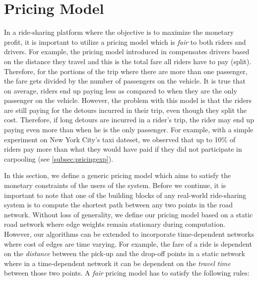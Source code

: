 \section{Pricing Model}
\label{sec:pricing}


In a ride-sharing platform where the objective is to maximize the monetary profit, it is important to utilize a pricing model which is \textit{fair} to both riders and drivers. For example, the pricing model introduced in \cite{Ma13} compensates drivers based on the distance they travel and this is the total fare all riders have to pay (split). Therefore, for the portions of the trip where there are more than one passenger, the fare gets divided by the number of passengers on the vehicle. It is true that on average, riders end up paying less as compared to when they are the only passenger on the vehicle. However, the problem with this model is that the riders are still paying for the detours incurred in their trip, even though they split the cost. Therefore, if long detours are incurred in a rider's trip, the rider may end up paying even more than when he is the only passenger. For example, with a simple experiment on New York City's taxi dateset, we observed that up to 10\% of riders pay more than what they would have paid if they did not participate in carpooling (see \cref{subsec:pricingexp}).

In this section, we define a generic pricing model which aims to satisfy the monetary constraints of the users of the system. Before we continue, it is important to note that one of the building blocks of any real-world ride-sharing system is to compute the shortest path between any two points in the road network. Without loss of generality, we define our pricing model based on a static road network where edge weights remain stationary during computation. However, our algorithms can be extended to incorporate time-dependent networks where cost of edges are time varying. For example, the fare of a ride is dependent on the \textit{distance} between the pick-up and the drop-off points in a static network where in a time-dependent network it can be dependent on the \textit{travel time} between those two points. A \textit{fair} pricing model has to satisfy the following rules:

